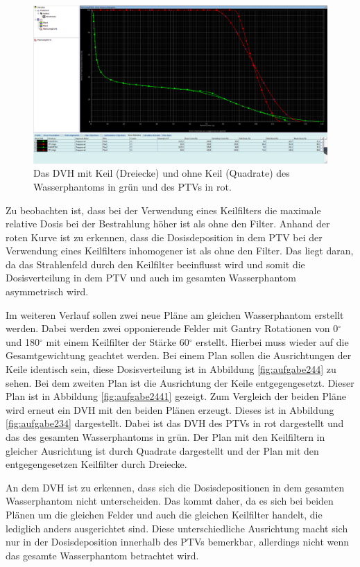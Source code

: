\begin{figure}[H]
	\centering
	\includegraphics[width=0.7\linewidth]{../../Wasserphantom Bilder/Aufgabe233.png}
	\caption{Das DVH mit Keil (Dreiecke) und ohne Keil (Quadrate) des Wasserphantoms in grün und des PTVs in rot.}
	\label{fig:aufgabe233}
\end{figure}

Zu beobachten ist, dass bei der Verwendung eines Keilfilters die maximale
relative Dosis bei der Bestrahlung höher ist als ohne den Filter. Anhand
der roten Kurve ist zu erkennen, dass die Dosisdeposition in dem PTV bei der
Verwendung eines Keilfilters inhomogener ist als ohne den Filter. Das
liegt daran, da das Strahlenfeld durch den Keilfilter beeinflusst wird und somit
die Dosisverteilung in dem PTV und auch im gesamten Wasserphantom asymmetrisch
wird.

Im weiteren Verlauf sollen zwei neue Pläne am gleichen Wasserphantom erstellt werden.
Dabei werden zwei opponierende Felder mit Gantry Rotationen von 0$^\circ$ und 180$^\circ$ mit einem Keilfilter der Stärke 60$^\circ$ erstellt. Hierbei muss wieder auf die Gesamtgewichtung geachtet werden. Bei einem Plan sollen die Ausrichtungen der Keile
identisch sein, diese Dosisverteilung ist in Abbildung \ref{fig:aufgabe244} zu sehen.
Bei dem zweiten Plan ist die Ausrichtung der Keile entgegengesetzt. Dieser Plan ist in
Abbildung \ref{fig:aufgabe2441} gezeigt.
Zum Vergleich der beiden Pläne wird erneut ein DVH mit den beiden Plänen erzeugt.
Dieses ist in Abbildung \ref{fig:aufgabe234} dargestellt. Dabei ist das DVH des PTVs
in rot dargestellt und das des gesamten Wasserphantoms in grün. Der Plan
mit den Keilfiltern in gleicher Ausrichtung ist durch Quadrate dargestellt und
der Plan mit den entgegengesetzen Keilfilter durch Dreiecke.

An dem DVH ist zu erkennen, dass sich die Dosisdepositionen in dem gesamten Wasserphantom
nicht unterscheiden. Das kommt daher, da es sich bei beiden Plänen um die gleichen
Felder und auch die gleichen Keilfilter handelt, die lediglich anders ausgerichtet sind.
Diese unterschiedliche Ausrichtung macht sich nur in der Dosisdeposition innerhalb
des PTVs bemerkbar, allerdings nicht wenn das gesamte Wasserphantom betrachtet wird.

